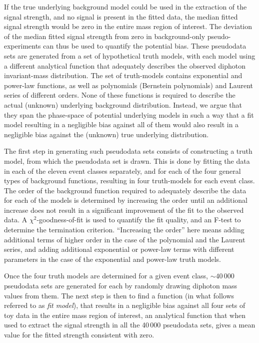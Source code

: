 \documentclass[12pt,twoside,a4paper,cmspaper,final,collab]{cms-tdr}
\begin{document}
If the true underlying background model could be used in the extraction of the signal strength,
and no signal is present in the fitted data, the median fitted signal strength would be zero in
the entire mass region of interest. The deviation of the median fitted signal strength from zero
in background-only pseudo-experiments can thus be used to quantify the potential bias.
These pseudodata sets
are generated from a set of hypothetical truth models, with each model using a different
analytical function that adequately describes the observed diphoton invariant-mass distribution.
The set of truth-models contains exponential and power-law functions,
as well as polynomials (Bernstein polynomials) and Laurent series of different orders.
None of these functions is required to describe the actual (unknown) underlying background distribution.
Instead, we argue that they span the phase-space of potential underlying
models in such a way that a fit model resulting in a negligible bias against all of them would also
result in a negligible bias against the (unknown) true underlying distribution.

The first step in generating such pseudodata sets consists of constructing a truth model, from which
the pseudodata set is drawn. This is done by fitting the data in each of the eleven event classes separately, and for each
of the four general types of background functions, resulting in four truth-models for each event class. The order
of the background function required to adequately describe the data for each of the models is determined
by increasing the order
until an additional increase does not result in a significant improvement of the fit to the
observed data. A $\chi^2$-goodness-of-fit is used to quantify the fit quality, and
an F-test to determine the termination criterion. ``Increasing the order'' here means adding additional
terms of higher order in the case of the polynomial and the Laurent series, and adding additional
exponential or power-law terms with different parameters in the case of the exponential and power-law
truth models.

Once the four truth models are determined for a given event class, ${\sim}40\,000$ pseudodata sets
are generated for each by randomly drawing diphoton mass values from them. The next step is then
to find a function (in what follows referred to as \emph{fit model}), that results in a negligible bias
against all four sets of toy data in the entire mass region of interest, \ie an analytical function that
when used to extract the signal strength in all the 40\,000  pseudodata sets, gives a mean value for the fitted strength
consistent with zero.
\end{document}
